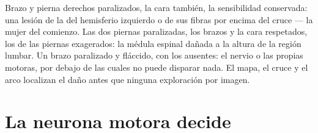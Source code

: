 \begin{example}\label{ex:g12:brain-and-movement:paralysis}
Brazo y pierna derechos paralizados, la cara también, la sensibilidad
conservada: una lesión de la  del hemisferio izquierdo o
de sus fibras por encima del cruce --- la mujer del comienzo. Las dos
piernas paralizadas, los brazos y la cara respetados, los  de
las piernas exagerados: la médula espinal dañada a la altura de la
región lumbar. Un brazo paralizado y fláccido, con los 
ausentes: el nervio o las propias  motoras, por debajo de las
cuales no puede disparar nada. El mapa, el cruce y el arco localizan el
daño antes que ninguna exploración por imagen.
\end{example}

\section{La neurona motora decide}

